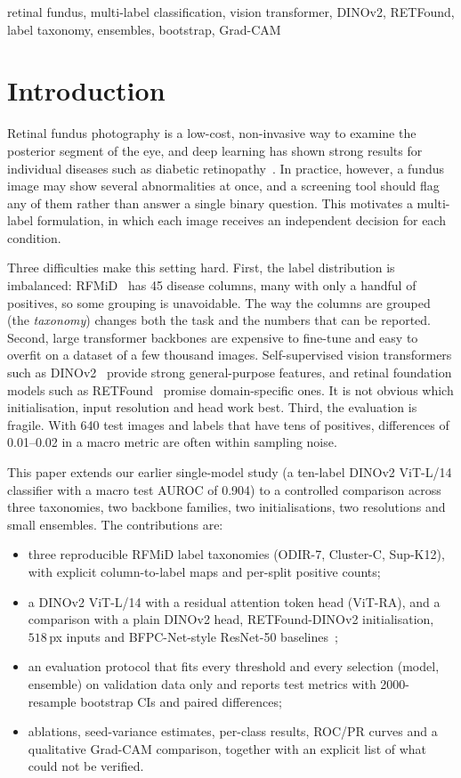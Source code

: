 ﻿\documentclass[conference]{IEEEtran}
\begin{document}
\begin{IEEEkeywords}
retinal fundus, multi-label classification, vision transformer, DINOv2, RETFound, label taxonomy, ensembles, bootstrap, Grad-CAM
\end{IEEEkeywords}

\section{Introduction}
Retinal fundus photography is a low-cost, non-invasive way to examine the posterior segment of the eye, and deep learning has shown strong results for individual diseases such as diabetic retinopathy~\cite{gulshan2016dr}.
In practice, however, a fundus image may show several abnormalities at once, and a screening tool should flag any of them rather than answer a single binary question.
This motivates a multi-label formulation, in which each image receives an independent decision for each condition.

Three difficulties make this setting hard.
First, the label distribution is imbalanced: RFMiD~\cite{pachade2021rfmid} has 45 disease columns, many with only a handful of positives, so some grouping is unavoidable. The way the columns are grouped (the \emph{taxonomy}) changes both the task and the numbers that can be reported.
Second, large transformer backbones are expensive to fine-tune and easy to overfit on a dataset of a few thousand images.
Self-supervised vision transformers such as DINOv2~\cite{oquab2024dinov2} provide strong general-purpose features, and retinal foundation models such as RETFound~\cite{zhou2023retfound} promise domain-specific ones. It is not obvious which initialisation, input resolution and head work best.
Third, the evaluation is fragile. With 640 test images and labels that have tens of positives, differences of 0.01--0.02 in a macro metric are often within sampling noise.

This paper extends our earlier single-model study (a ten-label DINOv2 ViT-L/14 classifier with a macro test AUROC of 0.904) to a controlled comparison across three taxonomies, two backbone families, two initialisations, two resolutions and small ensembles.
The contributions are:
\begin{itemize}
  \item three reproducible RFMiD label taxonomies (ODIR-7, Cluster-C, Sup-K12), with explicit column-to-label maps and per-split positive counts;
  \item a DINOv2 ViT-L/14 with a residual attention token head (ViT-RA), and a comparison with a plain DINOv2 head, RETFound-DINOv2 initialisation, $518$\,px inputs and BFPC-Net-style ResNet-50 baselines~\cite{li2022bfpc};
  \item an evaluation protocol that fits every threshold and every selection (model, ensemble) on validation data only and reports test metrics with 2000-resample bootstrap CIs and paired differences;
  \item ablations, seed-variance estimates, per-class results, ROC/PR curves and a qualitative Grad-CAM comparison, together with an explicit list of what could not be verified.
\end{itemize}
\end{document}
